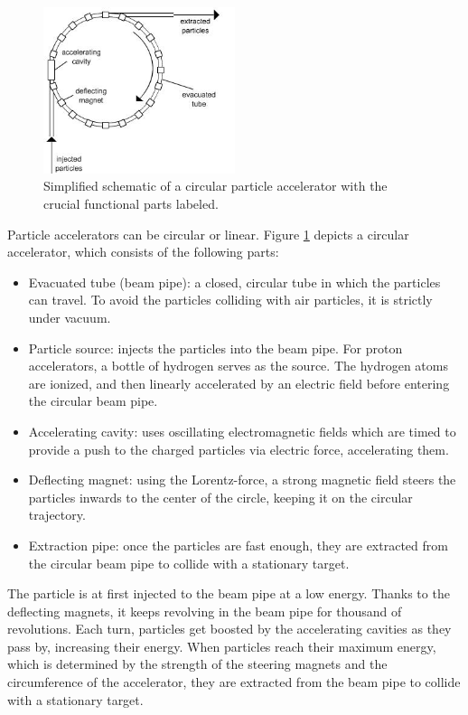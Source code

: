 \documentclass[12pt]{article}
\begin{document}
\begin{figure}[H]
	\begin{center}
		\includegraphics[width=0.5\textwidth]{particle_accelerator_schematic}
	\end{center}
	\caption{Simplified schematic of a circular particle accelerator with the crucial functional parts labeled.}
	\label{fig_part_accel_schematic}
\end{figure}

Particle accelerators can be circular or linear. Figure \ref{fig_part_accel_schematic} depicts a circular accelerator, which consists of the following parts:
\begin{itemize}
	\item Evacuated tube (beam pipe): a closed, circular tube in which the particles can travel. To avoid the particles colliding with air particles, it is strictly under vacuum.
	\item Particle source: injects the particles into the beam pipe. For proton accelerators, a bottle of hydrogen serves as the source. The hydrogen atoms are ionized, and then linearly accelerated by an electric field before entering the circular beam pipe.
	\item Accelerating cavity: uses oscillating electromagnetic fields which are timed to provide a push to the charged particles via electric force, accelerating them.
	\item Deflecting magnet: using the Lorentz-force, a strong magnetic field steers the particles inwards to the center of the circle, keeping it on the circular trajectory.
	\item Extraction pipe: once the particles are fast enough, they are extracted from the circular beam pipe to collide with a stationary target.
\end{itemize}

The particle is at first injected to the beam pipe at a low energy. Thanks to the deflecting magnets, it keeps revolving in the beam pipe for thousand of revolutions. Each turn, particles get boosted by the accelerating cavities as they pass by, increasing their energy. When particles reach their maximum energy, which is determined by the strength of the steering magnets and the circumference of the accelerator, they are extracted from the beam pipe to collide with a stationary target.
\end{document}
